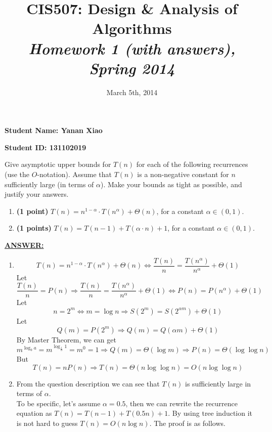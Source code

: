 \documentclass{article}
\begin{document}
\title{CIS507: Design \& Analysis of Algorithms\\\emph{Homework 1 (with answers), Spring 2014}}


\date{March 5th, 2014}

\maketitle
\textbf{Student Name: Yanan Xiao}

\vspace{0.2in}

\textbf{Student ID\@: 131102019}

\vspace{0.2in}


Give asymptotic upper bounds for $T(n)$ for each of the following
recurrences  (use the $O$-notation). Assume that $T(n)$ is a
non-negative constant for $n$ sufficiently large (in terms of
$\alpha$). Make your bounds as tight as possible, and justify your
answers. 

\begin{enumerate}
\item  \textbf{(1 point)} $T(n)=n^{1-\alpha}\cdot
  T(n^{\alpha})+\Theta(n)$, for a constant $\alpha\in (0,1)$.   
\item  \textbf{(1 points)} $T(n)= T(n-1)+T(\alpha\cdot n)+1$, for a
  constant $\alpha\in (0,1)$. 
\end{enumerate}
\noindent \underline{\textbf{ANSWER:}}

\begin{enumerate}
\item
$$ T(n)=n^{1-\alpha}\cdot T(n^{\alpha})+\Theta(n) \Leftrightarrow
\frac{T(n)}{n} = \frac{T(n^{\alpha})}{n^{\alpha}} + \Theta(1) $$ 
Let
$$ \frac{T(n)}{n} = P(n) \Rightarrow \frac{T(n)}{n} =
\frac{T(n^{\alpha})}{n^{\alpha}} + \Theta(1) \Leftrightarrow P(n) =
P(n^{\alpha}) + \Theta(1) $$  
Let $$ n = 2^m \Leftrightarrow m = \log n \Rightarrow S(2^m) =
S(2^{\alpha m}) + \Theta(1) $$ 
Let
$$ Q(m) = P(2^m) \Rightarrow Q(m) = Q(\alpha m) + \Theta(1) $$ 
By Master Theorem, we can get $$ m^{\log_b a} = m^{\log_{\frac{1}{\alpha}}
  1} = m^0 = 1 \Rightarrow Q(m) = \Theta(\log m) \Rightarrow
P(n)=\Theta(\log \log n) $$ 
But $$ T(n) = nP(n) \Rightarrow T(n) = \Theta(n\log \log n) = O(n \log
\log n)$$ 

\item
From the question description we can see that $T(n)$ is sufficiently
large in terms of $\alpha$.\\
To be specific, let's assume $\alpha=0.5$, then we can rewrite the
recurrence equation as $T(n) = T(n-1) + T(0.5n) + 1$. By using tree
induction it is not hard to guess $T(n) = O(n\log n)$. The proof is as
follows. 



\end{enumerate}
\end{document}
